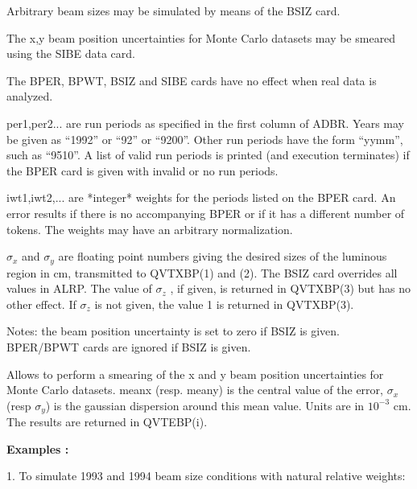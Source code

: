 Arbitrary beam sizes may be simulated by
means of the BSIZ card.
 
The x,y beam position uncertainties for Monte Carlo datasets may be smeared using the SIBE data card.

\par
The BPER, BPWT, BSIZ and SIBE cards have no effect when real data is analyzed.
 
\begin{indentlist}{ 4.50cm}{ 4.75cm}
 
\par
        per1,per2... are run periods as specified in the
  first column of ADBR.  Years may be given as ``1992'' or ``92''
  or ``9200''.  Other run periods have the form ``yymm'', such as
  ``9510''.  A list of valid run periods is printed (and
  execution terminates) if the BPER card is given with invalid
  or no run periods.
 
 
        iwt1,iwt2,... are *integer* weights for the periods
  listed on the BPER card.  An error results if there is no
  accompanying BPER or if it has a different number of tokens.
  The weights may have an arbitrary normalization.
 
 
        $\sigma_x$ and $\sigma_y$ are floating point numbers giving the
  desired sizes of the luminous region in cm, transmitted to QVTXBP(1) and (2).  The BSIZ card
  overrides all values in ALRP.  The value of $\sigma_z$ , if given,
  is returned in QVTXBP(3) but has no other effect.  If $\sigma_z$
  is not given, the value 1 is returned in QVTXBP(3).
 
  Notes: the beam position uncertainty is set to zero if BSIZ is
  given.  BPER/BPWT cards are ignored if BSIZ is given.


 Allows to perform a smearing of the x and y beam position uncertainties for Monte Carlo datasets.
 meanx (resp. meany) is the central value of the error, $\sigma_x$  (resp $\sigma_y$) is the gaussian dispersion   
 around this mean value.
 Units are in $10^{-3}$ cm. The results are returned in QVTEBP(i).  



\end{indentlist}
{\bf Examples :}
 
\par
1. To simulate 1993 and 1994 beam size conditions with natural relative
   weights:\
 
